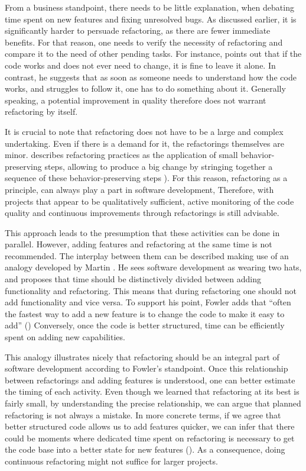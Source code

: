 From a business standpoint, there needs to be little explanation, 
	when debating time spent on new features and fixing unresolved bugs.
As discussed earlier, it is significantly harder to persuade refactoring, 
	as there are fewer immediate benefits.
For that reason, one needs to verify the necessity of refactoring
	and compare it to the need of other pending tasks.
For instance, \textcite{fowler2018} points out that if the code works and does not ever need to change, 
	it is fine to leave it alone.
In contrast, he suggests that as soon as someone needs to understand how the code works, 
	and struggles to follow it, one has to do something about it.
Generally speaking, a potential improvement in quality therefore does not warrant refactoring by itself.

It is crucial to note that refactoring does not have to be a large and complex undertaking.
Even if there is a demand for it, the refactorings themselves are minor.
\textcite{fowler2018} describes refactoring practices as the application of small behavior-preserving steps, 
	allowing to produce a big change by stringing together a sequence of these behavior-preserving steps ). 
For this reason, refactoring as a principle, 
	can always play a part in software development, 
Therefore, with projects that appear to be qualitatively sufficient, 
	active monitoring of the code quality and continuous improvements 
	through refactorings is still advisable.

This approach leads to the presumption that these activities can be done in parallel.
However, adding features and refactoring at the same time is not recommended.
The interplay between them can be described making use of an analogy developed by Martin \textcite{fowler2018}. 
He sees software development as wearing two hats, 
	and proposes that time should be distinctively divided between adding functionality and refactoring. 
This means that during refactoring one should not add functionality and vice versa. 
To support his point, 
	Fowler adds that “often the fastest way to add a new feature is to change the code to make it easy to add” (\cite{fowler2018}) 
Conversely, once the code is better structured, 
	time can be efficiently spent on adding new capabilities.

This analogy illustrates nicely that refactoring 
	should be an integral part of software development according to Fowler's standpoint. 
Once this relationship between refactorings and adding features is understood, 
	one can better estimate the timing of each activity.
Even though we learned that refactoring at its best is fairly small, 
	by understanding the precise relationship, 
	we can argue that planned refactoring is not always a mistake.
In more concrete terms, if we agree that better structured code 
	allows us to add features quicker, 
	we can infer that there could be moments where dedicated time spent on refactoring 
	is necessary to get the code base into a better state for new features (\cite{fowler2018}).
As a consequence, doing continuous refactoring might not suffice for larger projects. 

